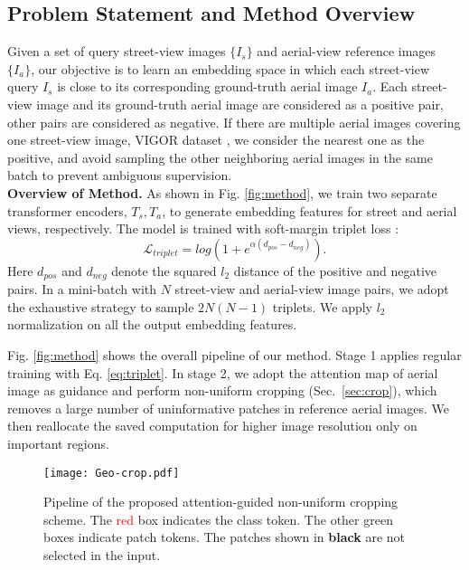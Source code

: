 \documentclass[10pt,twocolumn,letterpaper]{article}
\begin{document}
\subsection{Problem Statement and Method Overview}
\label{sec:problem}
Given a set of query street-view images $\{I_{s}\}$ and aerial-view reference images $\{I_{a}\}$, our objective is to learn an embedding space in which each street-view query $I_{s}$ is close to its corresponding ground-truth aerial image $I_{a}$. Each street-view image and its ground-truth aerial image are considered as a positive pair, other pairs are considered as negative. If there are multiple aerial images covering one street-view image, \eg VIGOR dataset \cite{zhu2021vigor}, we consider the nearest one as the positive, and avoid sampling the other neighboring aerial images in the same batch to prevent ambiguous supervision. \\
\noindent \textbf{Overview of Method.} As shown in Fig. \ref{fig:method}, we train two separate transformer encoders, \ie $T_{s},T_{a}$, to generate embedding features for street and aerial views, respectively. The model is trained with soft-margin triplet loss \cite{CVM}:
\begin{equation}
     \mathcal{L}_{triplet} = log\left(1+e^{\alpha(d_{pos}-d_{neg})}\right).
    \label{eq:triplet}
\end{equation}
Here $d_{pos}$ and $d_{neg}$ denote the squared $l_{2}$ distance of the positive and negative pairs. In a mini-batch with $N$ street-view and aerial-view image pairs, we adopt the exhaustive strategy \cite{facenet} to sample $2N(N-1)$ triplets. We apply $l_{2}$ normalization on all the output embedding features. 

Fig. \ref{fig:method} shows the overall pipeline of our method. Stage 1 applies regular training with Eq. \ref{eq:triplet}. In stage 2, we adopt the attention map of aerial image as guidance and perform non-uniform cropping (Sec.~\ref{sec:crop}), which removes a large number of uninformative patches in reference aerial images. We then reallocate the saved computation for higher image resolution only on important regions. 

\begin{figure*}[!htbp]
    \centering
\texttt{[image: Geo-crop.pdf]}
    \vspace{-0.25cm}
    \caption{Pipeline of the proposed attention-guided non-uniform cropping scheme. The \textcolor{red}{red} box indicates the class token. The other green boxes indicate patch tokens. The patches shown in  \textbf{black}  are not selected in the input.}
    \label{fig:crop}
\end{figure*}
\end{document}
